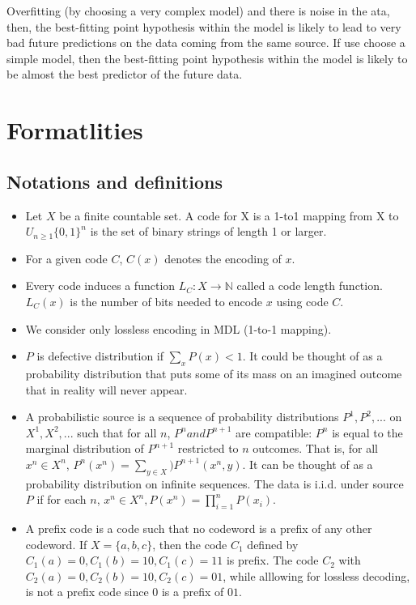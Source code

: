 \documentclass[../../main.tex]{subfiles}
\numberwithin{equation}{section}
\begin{document}
Overfitting (by choosing a very complex model) and there is noise in the ata, then, the best-fitting point hypothesis within the model is likely to lead to very bad future predictions on the data coming from the same source. If use choose a simple model, then the best-fitting point hypothesis within the model is likely to be almost the best predictor of the future data.
\section{Formatlities}
\subsection{Notations and definitions}
\begin{itemize}
    \item Let $X$ be a finite countable set. A code for X is a 1-to1 mapping from X to $U_{n\geq 1}\{0, 1\}^n$ is the set of binary strings of length 1 or larger.
    \item For a given code $C$, $C(x)$ denotes the encoding of $x$.
    \item Every code induces a function $L_C:X\rightarrow \mathbb{N}$ called a code length function. $L_C(x)$ is the number of bits needed to encode $x$ using code $C$.
    \item We consider only lossless encoding in MDL (1-to-1 mapping). 
    \item $P$ is defective distribution if $\sum_xP(x)<1$. It could be thought of as a probability distribution that puts some of its mass on an imagined outcome that in reality will never appear.
    \item A probabilistic source is a sequence of probability distributions $P^1, P^2, ...$ on $X^1, X^2, ...$ such that for all $n$, $P^n and P^{n+1}$ are compatible: $P^n$ is equal to the marginal distribution of $P^{n+1}$ restricted to $n$ outcomes. That is, for all $x^n\in X^n$, $P^n(x^n)=\sum\limits_{y\in X})P^{n+1}(x^n, y)$. It can be thought of as a probability distribution on infinite sequences. The data is i.i.d. under source $P$ if for each $n$, $x^n\in X^n, P(x^n)=\prod \limits_{i=1}^{n}P(x_i)$.
    \item A prefix code is a code such that no codeword is a prefix of any other codeword. If $X=\{a, b, c\}$, then the code $C_1$ defined by $C_1(a)=0, C_1(b)=10, C_1(c)=11$ is prefix. The code $C_2$ with $C_2(a)=0, C_2(b)=10, C_2(c)=01$, while alllowing for lossless decoding, is not a prefix code since $0$ is a prefix of $01$.
\end{itemize}
\end{document}

